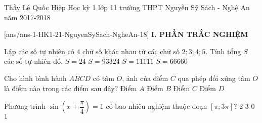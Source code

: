 	\begin{name}
		{Thầy Lê Quốc Hiệp}
		{Học kỳ 1 lớp 11 trường THPT Nguyễn Sỹ Sách - Nghệ An năm 2017-2018}
	\end{name}
	\setcounter{ex}{0}\setcounter{bt}{0}
	[ans/ans-1-HK1-21-NguyenSySach-NgheAn-18]
\noindent\textbf{I. PHẦN TRẮC NGHIỆM}
\begin{ex}%
	Lập các số tự nhiên có $4$ chữ số khác nhau từ các chữ số $2;3;4;5$. Tính tổng $S$ các số tự nhiên đó. 
	\choice
	{$S=24$}
	{\True $S=93324$}
	{$S=11111$}
	{$S=66660$}
\end{ex}

\begin{ex}%
	Cho hình bình hành $ABCD$ có tâm $O$, ảnh của điểm $C$ qua phép đối xứng tâm $O$ là điểm nào trong các điểm sau đây?
	\choice
	{\True Điểm $A$}
	{Điểm $B$}
	{Điểm $C$}
	{Điểm $D$}
\end{ex}

\begin{ex}%
	Phương trình $\sin \left( x+\dfrac{\pi}{4} \right)=1$ có bao nhiêu nghiệm thuộc đoạn $[\pi;3\pi]$?
	\choice
	{$2$}
	{$3$}
	{$0$}
	{\True $1$}
\end{ex}

